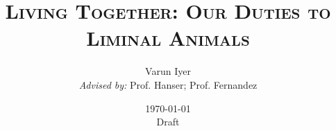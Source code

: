 \documentclass[12pt,oneside]{book}
\author{Varun Iyer \\ \emph{Advised by:} Prof. Hanser; Prof. Fernandez}
\date{\today \\ Draft \texttt{} }
\title{\textsc{Living Together: Our Duties to Liminal Animals}}
\begin{document}
\maketitle
\tableofcontents





\nocite{*}
\printbibliography
\end{document}
